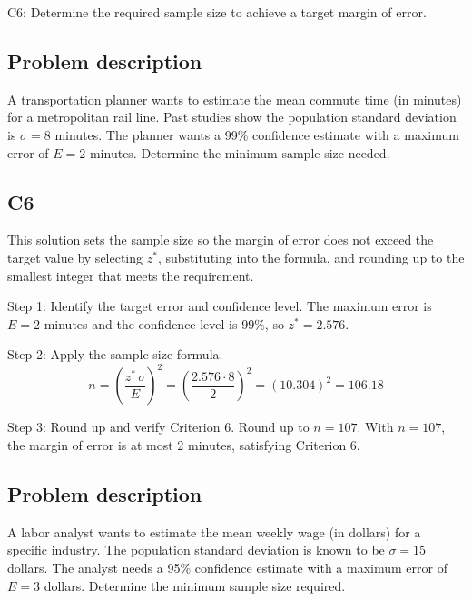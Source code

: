 

	
	\begin{ExamCriteria}
		\item C6: Determine the required sample size to achieve a target margin of error.
	\end{ExamCriteria}
	
	\begin{ExamProblems}
		\item
		\subsection*{Problem description}
		A transportation planner wants to estimate the mean commute time (in minutes) for a metropolitan rail line. Past studies show the population standard deviation is $\sigma = 8$ minutes. The planner wants a 99\% confidence estimate with a maximum error of $E = 2$ minutes. Determine the minimum sample size needed.
		
		\subsection*{C6}
		This solution sets the sample size so the margin of error does not exceed the target value by selecting $z^*$, substituting into the formula, and rounding up to the smallest integer that meets the requirement.
		
		Step 1: Identify the target error and confidence level. The maximum error is $E = 2$ minutes and the confidence level is 99\%, so $z^* = 2.576$.
		
		Step 2: Apply the sample size formula.
		\[
		n = \left(\frac{z^*\,\sigma}{E}\right)^2
		= \left(\frac{2.576 \cdot 8}{2}\right)^2
		= \left(10.304\right)^2
		= 106.18
		\]
		
		Step 3: Round up and verify Criterion 6. Round up to $n = 107$. With $n=107$, the margin of error is at most 2 minutes, satisfying Criterion 6.
		
		\item
		\subsection*{Problem description}
		A labor analyst wants to estimate the mean weekly wage (in dollars) for a specific industry. The population standard deviation is known to be $\sigma = 15$ dollars. The analyst needs a 95\% confidence estimate with a maximum error of $E = 3$ dollars. Determine the minimum sample size required.
		

\end{ExamProblems}

